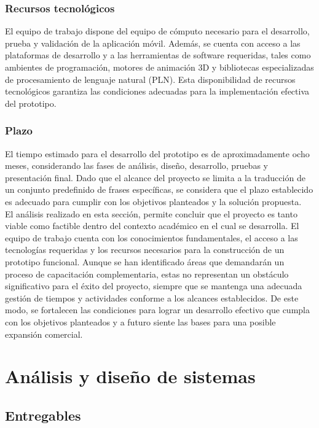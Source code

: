 \subsubsection{Recursos tecnológicos}
El equipo de trabajo dispone del equipo de cómputo necesario para el desarrollo, prueba y validación de la aplicación móvil. Además, se cuenta con acceso a las plataformas de desarrollo y a las herramientas de software requeridas, tales como ambientes de programación, motores de animación 3D y bibliotecas especializadas de procesamiento de lenguaje natural (PLN). Esta disponibilidad de recursos tecnológicos garantiza las condiciones adecuadas para la implementación efectiva del prototipo.

\subsubsection{Plazo}
El tiempo estimado para el desarrollo del prototipo es de aproximadamente ocho meses, considerando las fases de análisis, diseño, desarrollo, pruebas y presentación final. Dado que el alcance del proyecto se limita a la traducción de un conjunto predefinido de frases específicas, se considera que el plazo establecido es adecuado para cumplir con los objetivos planteados y la solución propuesta. \\


El análisis realizado en esta sección, permite concluir que el proyecto es tanto viable como factible dentro del contexto académico en el cual se desarrolla. El equipo de trabajo cuenta con los conocimientos fundamentales, el acceso a las tecnologías requeridas y los recursos necesarios para la construcción de un prototipo funcional. Aunque se han identificado áreas que demandarán un proceso de capacitación complementaria, estas no representan un obstáculo significativo para el éxito del proyecto, siempre que se mantenga una adecuada gestión de tiempos y actividades conforme a los alcances establecidos. De este modo, se fortalecen las condiciones para lograr un desarrollo efectivo que cumpla con los objetivos planteados y a futuro siente las bases para una posible expansión comercial.

\section{Análisis y diseño de sistemas}
\subsection{Entregables}

